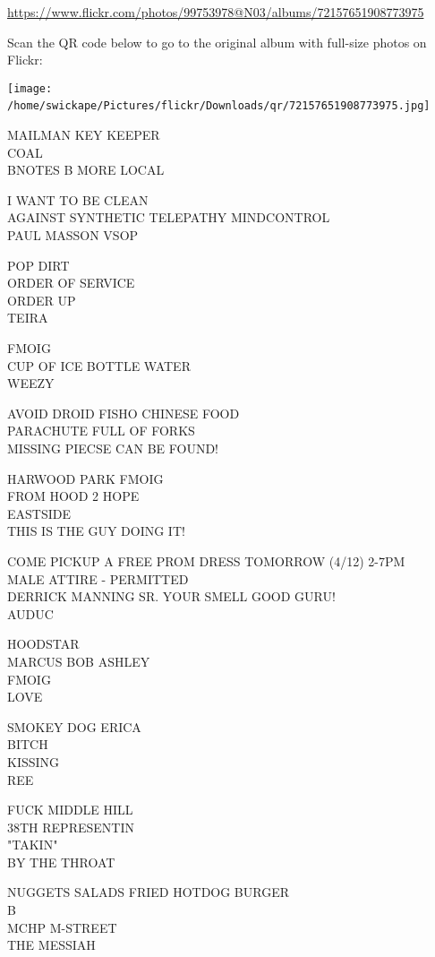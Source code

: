 \documentclass[10pt,letterpaper]{article}
\begin{document}
\url{https://www.flickr.com/photos/99753978@N03/albums/72157651908773975}

Scan the QR code below to go to the original album with full-size photos on Flickr:

\texttt{[image: /home/swickape/Pictures/flickr/Downloads/qr/72157651908773975.jpg]}
\

MAILMAN KEY KEEPER\\
COAL\\
BNOTES B MORE LOCAL

I WANT TO BE CLEAN\\
AGAINST SYNTHETIC TELEPATHY MINDCONTROL\\
PAUL MASSON VSOP

POP DIRT\\
ORDER OF SERVICE\\
ORDER UP\\
TEIRA

FMOIG\\
CUP OF ICE BOTTLE WATER\\
WEEZY

AVOID DROID FISHO CHINESE FOOD\\
PARACHUTE FULL OF FORKS\\
MISSING PIECSE CAN BE FOUND!

HARWOOD PARK FMOIG\\
FROM HOOD 2 HOPE\\
EASTSIDE\\
THIS IS THE GUY DOING IT!

COME PICKUP A FREE PROM DRESS TOMORROW (4/12) 2{-}7PM\\
MALE ATTIRE {-} PERMITTED\\
DERRICK MANNING SR.  YOUR SMELL GOOD GURU!\\
AUDUC

HOODSTAR\\
MARCUS BOB ASHLEY\\
FMOIG\\
LOVE

SMOKEY DOG ERICA\\
BITCH\\
KISSING\\
REE

FUCK MIDDLE HILL\\
38TH REPRESENTIN\\
"TAKIN"\\
BY THE THROAT

NUGGETS SALADS FRIED HOTDOG BURGER\\
B\\
MCHP M{-}STREET\\
THE MESSIAH
\end{document}
